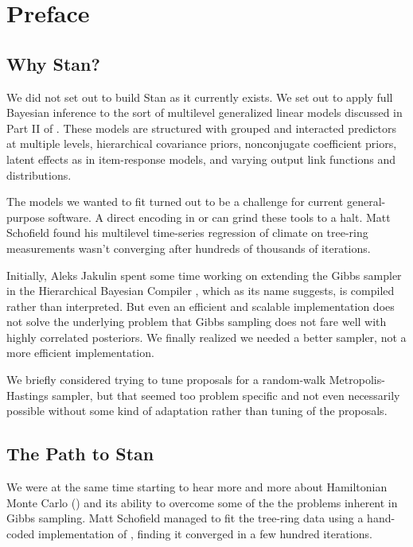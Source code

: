 \chapter*{Preface}

\section*{Why Stan?}

We did not set out to build Stan as it currently exists.  We set out to
apply full Bayesian inference to the sort of multilevel generalized
linear models discussed in Part II of \citep{GelmanHill:2007}.  These
models are structured with grouped and interacted predictors at
multiple levels, hierarchical covariance priors, nonconjugate
coefficient priors, latent effects as in item-response models, and
varying output link functions and distributions.

The models we wanted to fit turned out to be a challenge for current
general-purpose software.  A direct encoding in \BUGS or \JAGS can
grind these tools to a halt.  Matt Schofield found his multilevel
time-series regression of climate on tree-ring measurements wasn't
converging after hundreds of thousands of iterations.

Initially, Aleks Jakulin spent some time working on extending the
Gibbs sampler in the Hierarchical Bayesian Compiler
\citep{DaumeIII:2007}, which as its name suggests, is compiled rather
than interpreted.  But even an efficient and scalable implementation
does not solve the underlying problem that Gibbs sampling does not
fare well with highly correlated posteriors.  We finally realized we
needed a better sampler, not a more efficient implementation.

We briefly considered trying to tune proposals for a random-walk
Metropolis-Hastings sampler, but that seemed too problem specific and
not even necessarily possible without some kind of adaptation rather
than tuning of the proposals. 
 

\section*{The Path to Stan}

We were at the same time starting to hear more and more about
Hamiltonian Monte Carlo (\HMC) and its ability to overcome some of the
the problems inherent in Gibbs sampling.  Matt Schofield managed to
fit the tree-ring data using a hand-coded implementation of \HMC,
finding it converged in a few hundred iterations.

